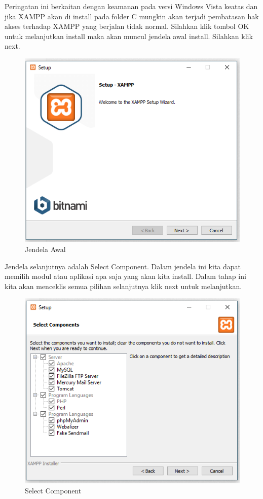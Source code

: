 Peringatan ini berkaitan dengan keamanan pada versi Windows Vista keatas dan jika XAMPP akan di install pada folder C mungkin akan terjadi pembatasan hak akses terhadap XAMPP yang berjalan tidak normal. Silahkan klik tombol OK untuk melanjutkan install maka akan muncul jendela awal install. Silahkan klik next.

 \begin{figure}[h]
\centering
\includegraphics[scale=0.5]{figures/jendelaawal}
\caption{Jendela Awal}
\end{figure}

Jendela selanjutnya adalah Select Component. Dalam jendela ini kita dapat memilih modul atau aplikasi apa saja yang akan kita install. Dalam tahap ini kita akan menceklis semua pilihan selanjutnya klik next untuk melanjutkan.

\begin{figure}[h]
\centering
\includegraphics[scale=0.5]{figures/selectcomponent}
\caption{Select Component}
\end{figure}


